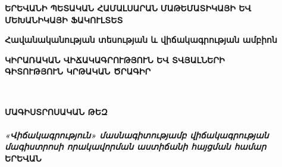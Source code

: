\setmainfont{DejaVu Sans}


\begin{center}

\fontsize{18pt}{19.2pt} \textbf{ԵՐԵՎԱՆԻ ՊԵՏԱԿԱՆ ՀԱՄԱԼՍԱՐԱՆ}\vspace{11.5pt}
\fontsize{18pt}{16.8pt}  \textbf{\uppercase{ՄԱԹԵՄԱՏԻԿԱՅԻ ԵՎ ՄԵԽԱՆԻԿԱՅԻ ՖԱԿՈՒԼՏԵՏ}}\\ 
    \vfill

\fontsize{16pt}{16.8pt} \textbf { {Հավանականության տեսության և վիճակագրության ամբիոն}}\\

\vfill 
   
\fontsize{17.8pt}{16.8pt} \textbf { \uppercase{ԿԻՐԱՌԱԿԱՆ ՎԻՃԱԿԱԳՐՈՒԹՅՈՒՆ ԵՎ ՏՎՅԱԼՆԵՐԻ \\ ԳԻՏՈՒԹՅՈՒՆ ԿՐԹԱԿԱՆ ԾՐԱԳԻՐ} \\}

\vfill

\fontsize{18pt}{21.6pt} \textbf{\MakeUppercase{\authorFullNameArm}}\\

\vfill

\fontsize{18pt}{36pt}\textbf{\uppercase{ՄԱԳԻՍՏՐՈՍԱԿԱՆ ԹԵԶ
}}\\

\vfill
\fontsize{18pt}{21.6pt} \textbf{\MakeUppercase{\thesisTitleArm}}\\

\vfill
\fontsize{13.3pt}{16.8pt} \textbf{\textit{«Վիճակագրություն» մասնագիտությամբ վիճակագրության \\ մագիստրոսի որակավորման աստիճանի հայցման համար
\\}}
\vfill
\fontsize{13pt}{15.6pt}  \textbf{ԵՐԵՎԱՆ \the\year}     

\end{center}
\thispagestyle{empty}
\pagebreak
